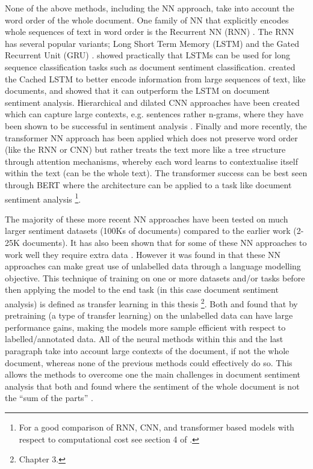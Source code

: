None of the above methods, including the NN approach, take into account the word order of the whole document. One family of NN that explicitly encodes whole sequences of text in word order is the Recurrent NN (RNN) \citep{rumelhart1985learning}. The RNN has several popular variants; Long Short Term Memory (LSTM) \citep{hochreiter1997long} and the Gated Recurrent Unit (GRU) \citep{cho-etal-2014-learning}. \citet{dai2015semi} showed practically that LSTMs can be used for long sequence classification tasks such as document sentiment classification. \citet{xu-etal-2016-cached} created the Cached LSTM to better encode information from large sequences of text, like documents, and showed that it can outperform the LSTM on document sentiment analysis. Hierarchical \citep{zhang2015character} and dilated \citep{strubell-etal-2017-fast} CNN approaches have been created which can capture large contexts, e.g. sentences rather n-grams, where they have been shown to be successful in sentiment analysis \citep{conneau-etal-2017-deep}. Finally and more recently, the transformer NN \citep{vaswani2017attention} approach has been applied which does not preserve word order (like the RNN or CNN) but rather treats the text more like a tree structure through attention mechanisms, whereby each word learns to contextualise itself within the text (can be the whole text). The transformer success can be best seen through BERT \citep{devlin-etal-2019-bert} where the architecture can be applied to a task like document sentiment analysis \citep{sun2019fine}\footnote{For a good comparison of RNN, CNN, and transformer based models with respect to computational cost see section 4 of \citet{vaswani2017attention}.}. 

The majority of these more recent NN approaches have been tested on much larger sentiment datasets (100Ks of documents) compared to the earlier work (2-25K documents). It has also been shown that for some of these NN approaches to work well they require extra data \citep{dai2015semi}. However it was found in \citet{dai2015semi} that these NN approaches can make great use of unlabelled data through a language modelling objective. This technique of training on one or more datasets and/or tasks before then applying the model to the end task (in this case document sentiment analysis) is defined as transfer learning in this thesis \citep{ruder2019neural}\footnote{Chapter 3.}.  Both \citet{howard-ruder-2018-universal} and \citet{sun2019fine} found that by pretraining (a type of transfer learning) on the unlabelled data can have large performance gains, making the models more sample efficient with respect to labelled/annotated data. All of the neural methods within this and the last paragraph take into account large contexts of the document, if not the whole document, whereas none of the previous methods could effectively do so. This allows the methods to overcome one the main challenges in document sentiment analysis that both \citet{turney-2002-thumbs} and \citet{pang-etal-2002-thumbs} found where the sentiment of the whole document is not the ``sum of the parts'' \citep{turney-2002-thumbs}.

